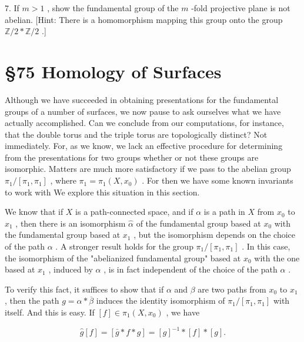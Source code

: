 \documentclass[10pt]{article}
\begin{document}
7. If \(m > 1\) , show the fundamental group of the \(m\) -fold projective plane is not abelian. [Hint: There is a homomorphism mapping this group onto the group \(\mathbb{Z}/2 * \mathbb{Z}/2\) .]

\section*{§75 Homology of Surfaces}

Although we have succeeded in obtaining presentations for the fundamental groups of a number of surfaces, we now pause to ask ourselves what we have actually accomplished. Can we conclude from our computations, for instance, that the double torus and the triple torus are topologically distinct? Not immediately. For, as we know, we lack an effective procedure for determining from the presentations for two groups whether or not these groups are isomorphic. Matters are much more satisfactory if we pass to the abelian group \({\pi }_{1}/\left\lbrack  {{\pi }_{1},{\pi }_{1}}\right\rbrack\) , where \({\pi }_{1} = {\pi }_{1}\left( {X,{x}_{0}}\right)\) . For then we have some known invariants to work with We explore this situation in this section.

We know that if \(X\) is a path-connected space, and if \(\alpha\) is a path in \(X\) from \({x}_{0}\) to \({x}_{1}\) , then there is an isomorphism \(\widehat{\alpha }\) of the fundamental group based at \({x}_{0}\) with the fundamental group based at \({x}_{1}\) , but the isomorphism depends on the choice of the path \(\alpha\) . A stronger result holds for the group \({\pi }_{1}/\left\lbrack  {{\pi }_{1},{\pi }_{1}}\right\rbrack\) . In this case, the isomorphism of the "abelianized fundamental group" based at \({x}_{0}\) with the one based at \({x}_{1}\) , induced by \(\alpha\) , is in fact independent of the choice of the path \(\alpha\) .

To verify this fact, it suffices to show that if \(\alpha\) and \(\beta\) are two paths from \({x}_{0}\) to \({x}_{1}\) , then the path \(g = \alpha  * \overline{\beta }\) induces the identity isomorphism of \({\pi }_{1}/\left\lbrack  {{\pi }_{1},{\pi }_{1}}\right\rbrack\) with itself. And this is easy. If \(\left\lbrack  f\right\rbrack   \in  {\pi }_{1}\left( {X,{x}_{0}}\right)\) , we have

\[
\widehat{g}\left\lbrack  f\right\rbrack   = \left\lbrack  {\bar{g} * f * g}\right\rbrack   = {\left\lbrack  g\right\rbrack  }^{-1} * \left\lbrack  f\right\rbrack   * \left\lbrack  g\right\rbrack  .
\]
\end{document}
